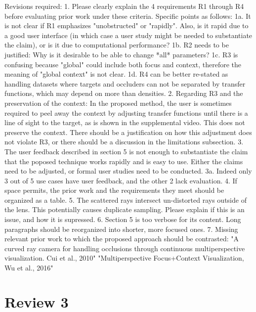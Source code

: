 \documentclass[a4paper,10pt]{article}
\begin{document}
    Revisions required:
    1. Please clearly explain the 4 requirements R1 through R4 before evaluating prior
    work under these criteria. Specific points as follows:
    1a. It is not clear if R1 emphasizes "unobstructed" or "rapidly". Also, is it
    rapid due to a good user interface (in which case a user study might be needed to
    substantiate the claim), or is it due to computational performance?
    1b. R2 needs to be justified: Why is it desirable to be able to change *all*
    parameters?
    1c. R3 is confusing because "global" could include both focus and context,
    therefore the meaning of "global context" is not clear.
    1d. R4 can be better re-stated as handling datasets where targets and occluders
    can not be separated by transfer functions, which may depend on more than
    densities.
    2. Regarding R3 and the preservation of the context: In the proposed method, the
    user is sometimes required to peel away the context by adjusting transfer
    functions until there is a line of sight to the target, as is shown in the
    supplemental video. This does not preserve the context. There should be a
    justification on how this adjustment does not violate R3, or there should be a
    discussion in the limitations subsection.
    3. The user feedback described in section 5 is not enough to substantiate the
    claim that the poposed technique works rapidly and is easy to use. Either the
    claims need to be adjusted, or formal user studies need to be conducted.
    3a. Indeed only 3 out of 5 use cases have user feedback, and the other 2 lack
    evaluation.
    4. If space permits, the prior work and the requirements they meet should be
    organized as a table.
    5. The scattered rays intersect un-distorted rays outside of the lens. This
    potentially causes duplicate sampling. Please explain if this is an issue, and how
    it is supressed.
    6. Section 5 is too verbose for its content. Long paragraphs should be reorganized
    into shorter, more focused ones.
    7. Missing relevant prior work to which the proposed approach should be
    contrasted:
    "A curved ray camera for handling occlusions through continuous multiperspective
    visualization. Cui et al., 2010"
    "Multiperspective Focus+Context Visualization, Wu et al., 2016"
    
    

\section{Review 3}
\end{document}
